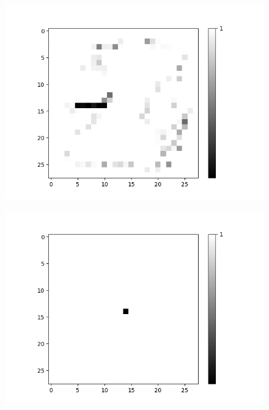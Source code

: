 \begin{figure}[H]
	\captionsetup{labelformat=empty}
	\centering
	\begin{minipage}[b]{0.19\textwidth}
		\includegraphics[width=\textwidth]{OR-AND(WO-LSM)(1)/DontLike/True/Layer0-Neuron-28.png}
		\label{}
	\end{minipage}

	\medskip
	
	\begin{minipage}[b]{0.19\textwidth}
		\includegraphics[width=\textwidth]{OR-AND(WO-LSM)(1)/DontLike/False/Layer0-Neuron-28.png}
		\label{}
	\end{minipage}
	\hfill
\end{figure}

